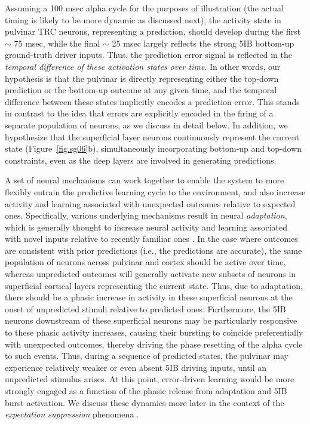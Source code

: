 \documentclass[11pt,twoside]{article}
\newif\myifpdf
\begin{document}
Assuming a 100 msec alpha cycle for the purposes of illustration (the actual timing is likely to be more dynamic as discussed next), the activity state in pulvinar TRC neurons, representing a prediction, should develop during the first $\sim$ 75 msec, while the final $\sim$ 25 msec largely reflects the strong 5IB bottom-up ground-truth driver inputs.  Thus, the prediction error signal is reflected in the \emph{temporal difference of these activation states over time}.  In other words, our hypothesis is that the pulvinar is directly representing either the top-down prediction or the bottom-up outcome at any given time, and the temporal difference between these states implicitly encodes a prediction error. This stands in contrast to the idea that errors are explicitly encoded in the firing of a separate population of neurons, as we discuss in detail below.  In addition, we hypothesize that the superficial layer neurons continuously represent the current state (Figure~\ref{fig.sg06}b), simultaneously incorporating bottom-up and top-down constraints, even as the deep layers are involved in generating predictions.

A set of neural mechanisms can work together to enable the system to more flexibly entrain the predictive learning cycle to the environment, and also increase activity and learning associated with unexpected outcomes relative to expected ones.  Specifically, various underlying mechanisms result in neural \emph{adaptation}, which is generally thought to increase neural activity and learning associated with novel inputs relative to recently familiar ones \citep{MullerMethaKrauskopfEtAl99,AbbottVarelaSenEtAl97,BretteGerstner05,Grill-SpectorHensonMartin06,Hennig13}.  In the case where outcomes are consistent with prior predictions (i.e., the predictions are accurate), the same population of neurons across pulvinar and cortex should be active over time, whereas unpredicted outcomes will generally activate new subsets of neurons in superficial cortical layers representing the current state.  Thus, due to adaptation, there should be a phasic increase in activity in these superficial neurons at the onset of unpredicted stimuli relative to predicted ones.  Furthermore, the 5IB neurons downstream of these superficial neurons may be particularly responsive to these phasic activity increases, causing their bursting to coincide preferentially with unexpected outcomes, thereby driving the phase resetting of the alpha cycle to such events.  Thus, during a sequence of predicted states, the pulvinar may experience relatively weaker or even absent 5IB driving inputs, until an unpredicted stimulus arises.  At this point, error-driven learning would be more strongly engaged as a function of the phasic release from adaptation and 5IB burst activation.  We discuss these dynamics more later in the context of the \emph{expectation suppression} phenomena \citep{SummerfieldTrittschuhMontiEtAl08,TodorovicEdeMarisEtAl11,MeyerOlson11,BastosUsreyAdamsEtAl12}.
\end{document}
